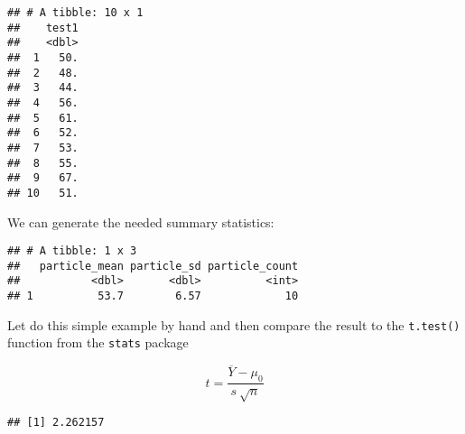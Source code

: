 \documentclass[]{book}
\newenvironment{Shaded}{\begin{snugshade}}{\end{snugshade}}
\newcommand{\DataTypeTok}[1]{\textcolor[rgb]{0.13,0.29,0.53}{#1}}
\newcommand{\DecValTok}[1]{\textcolor[rgb]{0.00,0.00,0.81}{#1}}
\newcommand{\FloatTok}[1]{\textcolor[rgb]{0.00,0.00,0.81}{#1}}
\newcommand{\KeywordTok}[1]{\textcolor[rgb]{0.13,0.29,0.53}{\textbf{#1}}}
\newcommand{\NormalTok}[1]{#1}
\newcommand{\OperatorTok}[1]{\textcolor[rgb]{0.81,0.36,0.00}{\textbf{#1}}}
\newcommand{\StringTok}[1]{\textcolor[rgb]{0.31,0.60,0.02}{#1}}
\theoremstyle{definition}
\theoremstyle{definition}
\theoremstyle{definition}
\theoremstyle{remark}
\begin{document}
\begin{verbatim}
## # A tibble: 10 x 1
##    test1
##    <dbl>
##  1   50.
##  2   48.
##  3   44.
##  4   56.
##  5   61.
##  6   52.
##  7   53.
##  8   55.
##  9   67.
## 10   51.
\end{verbatim}

We can generate the needed summary statistics:

\begin{Shaded}
\end{Shaded}

\begin{verbatim}
## # A tibble: 1 x 3
##   particle_mean particle_sd particle_count
##           <dbl>       <dbl>          <int>
## 1          53.7        6.57             10
\end{verbatim}

Let do this simple example by hand and then compare the result to the
\texttt{t.test()} function from the \texttt{stats} package

\[ t = \frac {\overline{Y} - \mu_0} {{s~} {\sqrt{n}}} \]

\begin{Shaded}
\end{Shaded}

\begin{verbatim}
## [1] 2.262157
\end{verbatim}
\end{document}

